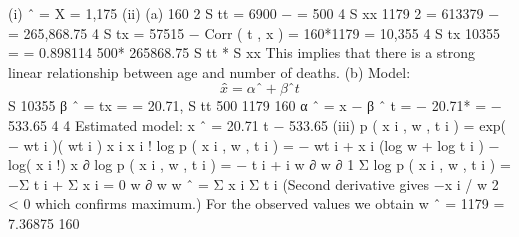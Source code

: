 \documentclass[a4paper,12pt]{article}
\begin{document}
(i) \mu ˆ = X = 1,175
(ii)
(a)
160 2
S tt = 6900 −
= 500
4
S xx
1179 2
= 613379 −
= 265,868.75
4
S tx = 57515 −
Corr ( t , x ) =
160*1179
= 10,355
4
S tx
10355
=
= 0.898114
500* 265868.75
S tt * S xx
This implies that there is a strong linear relationship between age and number of deaths.
(b)
Model: \[x̂ = α ˆ + β ˆ t\]
S
10355
β ˆ = tx =
= 20.71,
S tt
500
1179
160
α ˆ = x − β ˆ t =
− 20.71*
= − 533.65
4
4
Estimated model: x ˆ = 20.71 t − 533.65
(iii)
p ( x i , w , t i ) =
exp( − wt i )( wt i ) x i
x i !
log p ( x i , w , t i ) = − wt i + x i (log w + log t i ) − log( x i !)
x
∂
log p ( x i , w , t i ) = − t i + i
w
∂ w
∂
1
Σ
log p ( x i , w , t i ) = −Σ t i + Σ x i = 0
w
∂ w
w ˆ =
Σ x i
Σ t i
(Second derivative gives −\sum x i / w 2 < 0 which confirms maximum.)
For the observed values we obtain w ˆ =
1179
= 7.36875
160
\end{document}
